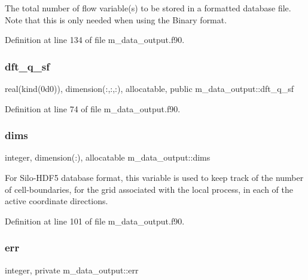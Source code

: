 The total number of flow variable(s) to be stored in a formatted database file. Note that this is only needed when using the Binary format. 



Definition at line 134 of file m\+\_\+data\+\_\+output.\+f90.

\mbox{\label{namespacem__data__output_a94a7c7e9bb108dc2d3360e1cd40d4909}} 
\subsubsection{\texorpdfstring{dft\+\_\+q\+\_\+sf}{dft\_q\_sf}}
{\footnotesize\ttfamily real(kind(0d0)), dimension(\+:,\+:,\+:), allocatable, public m\+\_\+data\+\_\+output\+::dft\+\_\+q\+\_\+sf}



Definition at line 74 of file m\+\_\+data\+\_\+output.\+f90.

\mbox{\label{namespacem__data__output_a98d3ca969b0e32fa09436f1a9cfbd77c}} 
\subsubsection{\texorpdfstring{dims}{dims}}
{\footnotesize\ttfamily integer, dimension(\+:), allocatable m\+\_\+data\+\_\+output\+::dims}



For Silo-\/\+H\+D\+F5 database format, this variable is used to keep track of the number of cell-\/boundaries, for the grid associated with the local process, in each of the active coordinate directions. 



Definition at line 101 of file m\+\_\+data\+\_\+output.\+f90.

\mbox{\label{namespacem__data__output_a9200025029de298307a47699927a60fa}} 
\subsubsection{\texorpdfstring{err}{err}}
{\footnotesize\ttfamily integer, private m\+\_\+data\+\_\+output\+::err\hspace{0.3cm}{\ttfamily [private]}}



